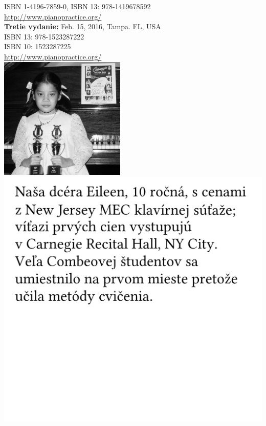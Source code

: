 \documentclass[11pt,a4paper]{book}
\begin{document}
\indent ISBN 1-4196-7859-0, ISBN 13: 978-1419678592\\
\indent \href{http://www.pianopractice.org/}{http://www.pianopractice.org/}
\vspace*{2em}\\
\noindent \textbf{Tretie vydanie:} Feb. 15, 2016, Tampa. FL, USA\\
\indent ISBN 13: 978-1523287222\\
\indent ISBN 10: 1523287225\\
\indent \href{http://www.pianopractice.org/}{http://www.pianopractice.org/}\\
\includegraphics[width=6cm]{figures/Eileen.jpg} \includegraphics[scale=0.15]{figures/EileenTextSK.png}\\
\end{document}
